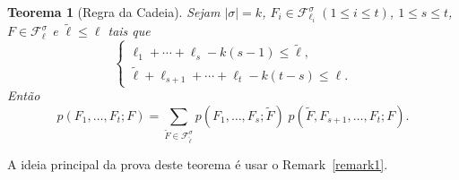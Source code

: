 \documentclass{amsart}
\theoremstyle{theorem}
\newtheorem{teorema}{Teorema}[section]
\theoremstyle{definition}
\theoremstyle{remark}
\numberwithin{equation}{section}
\begin{document}
\begin{teorema}[Regra da Cadeia]
  Sejam $|\sigma| = k$, $F_i\in\mathcal{F}^{\sigma}_{\ell_i}\; (1\leq i \leq t)$, $1\leq s \leq t$, $F \in \mathcal{F}^{\sigma}_{\ell}$ e $\tilde{\ell} \leq \ell$ tais que
  \begin{equation}\label{RCin}
    \left\{
       \begin{array}{l}
         \ell_1 + \cdots + \ell_s - k(s-1) \leq \tilde{\ell}, \\
         \tilde{\ell} + \ell_{s+1} + \cdots + \ell_t - k(t-s) \leq \ell.
       \end{array}
     \right.
  \end{equation}
Ent\~{a}o
\begin{equation}\label{RC}
  p(F_1,\ldots,F_t;F) = \sum_{\tilde{F}\in\mathcal{F}^{\sigma}_{\tilde{\ell}}} p(F_1,\ldots,F_s;\tilde{F})\;p(\tilde{F},F_{s+1},\ldots,F_t;F).
\end{equation}
\end{teorema}

A ideia principal da prova deste teorema \'{e} usar o Remark~\ref{remark1}.
\end{document}
